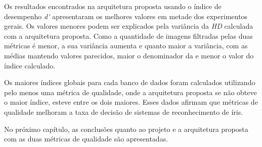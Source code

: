 \par Os resultados encontrados na arquitetura proposta usando o índice de desempenho \textit{\acrshort{d'}} apresentaram os melhores valores em metade dos experimentos gerais. Os valores menores podem ser explicados pela variância da \textit{\acrshort{HD}} calculada com a arquitetura proposta. Como a quantidade de imagens filtradas pelas duas métricas é menor, a sua variância aumenta e quanto maior a variância, com as médias mantendo valores parecidos, maior o denominador da  e menor o valor do índice calculado. 

\par Os maiores índices globais para cada banco de dados foram calculados utilizando pelo menos uma métrica de qualidade, onde a arquitetura proposta se não obteve o maior índice, esteve entre os dois maiores. Esses dados afirmam que métricas de qualidade melhoram a taxa de decisão de sistemas de reconhecimento de íris.


\par No próximo capítulo, as conclusões quanto ao projeto e a arquitetura proposta com as duas métricas de qualidade são apresentadas.
